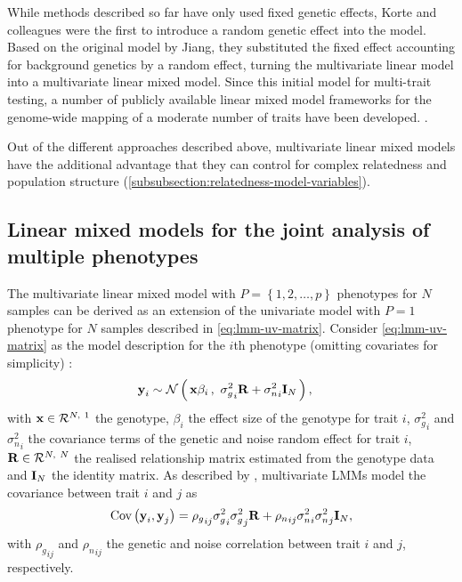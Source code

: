 While methods described so far have only used fixed genetic effects, Korte and colleagues \parencite*{Korte2012} were the first to introduce a random genetic effect into the model. Based on the original model by Jiang, they substituted the fixed effect accounting for background genetics by a random effect, turning the multivariate linear model into a multivariate linear mixed model. Since this initial model for multi-trait testing, a number of publicly available linear mixed model frameworks for the genome-wide mapping of a moderate number of traits have been developed. \citep{Yang2014,Lippert2014,Zhou2014,Casale2015}. 

Out of the different approaches described above, multivariate linear mixed models have the additional advantage that they can control for complex relatedness and population structure (\cref{subsubsection:relatedness-model-variables}). 

\subsection{Linear mixed models for the joint analysis of multiple phenotypes}
The multivariate linear mixed model with \(P=\left\{1,2,\dots,p\right\}\) phenotypes for \(N\) samples can be derived as an extension of the univariate model with \(P=1\) phenotype for \(N\) samples described in \cref{eq:lmm-uv-matrix}. Consider \cref{eq:lmm-uv-matrix} as the model description for the \(i\)th phenotype (omitting covariates for simplicity) :
\begin{align} 
\boldsymbol{\mathbf{y}}_i &\sim \mathcal{N}\left(\,{\boldsymbol{\mathbf{x}}\beta_i}\,,~{{\sigma_g^2}_i\boldsymbol{\mathbf{R}} + {\sigma_n^2}_i\boldsymbol{\mathbf{I}}_N}\,\right),
\label{eq:lmm-mv-p}
\end{align}
%
with \(\boldsymbol{\mathbf{x}} \in \mathcal{R}^{N,~1}\) the genotype, \(\beta_i\) the effect size of the genotype for trait \(i\),  \({\sigma_g^2}_i\) and \({\sigma_n^2}_i\) the covariance terms of the genetic and noise random effect for trait \(i\), \(\boldsymbol{\mathbf{R}} \in \mathcal{R}^{N,~N}\)  the realised relationship matrix estimated from the genotype data and \(\boldsymbol{\mathbf{I}}_N\) the identity matrix. As described by \citet{Henderson1976}, multivariate LMMs model the covariance between trait \(i\) and \(j\) as
\begin{align}
\text{Cov}\left(\boldsymbol{\mathbf{y}}_i, \boldsymbol{\mathbf{y}}_j\right) = {\rho_g}_{ij}{\sigma_g^2}_i{\sigma_g^2}_j\boldsymbol{\mathbf{R}} +  {\rho_n}_{ij}{\sigma_n^2}_i{\sigma_n^2}_j\boldsymbol{\mathbf{I}}_N,
\label{eq:cov-lmm-mv}
\end{align}
%
with \( {\rho_g}_{ij}\) and \( {\rho_n}_{ij}\) the genetic and noise correlation between trait \(i\) and \(j\), respectively. 

